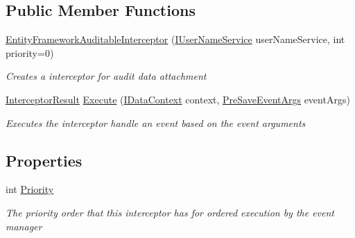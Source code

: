\subsection*{Public Member Functions}
\begin{DoxyCompactItemize}
\item 
\hyperlink{class_highway_1_1_data_1_1_entity_framework_1_1_interceptors_1_1_entity_framework_auditable_interceptor_af82e7af9db91d333a1faf197398405f3}{Entity\-Framework\-Auditable\-Interceptor} (\hyperlink{interface_highway_1_1_data_1_1_interfaces_1_1_i_user_name_service}{I\-User\-Name\-Service} user\-Name\-Service, int priority=0)
\begin{DoxyCompactList}\small\item\em Creates a interceptor for audit data attachment \end{DoxyCompactList}\item 
\hyperlink{struct_highway_1_1_data_1_1_interceptors_1_1_interceptor_result}{Interceptor\-Result} \hyperlink{class_highway_1_1_data_1_1_entity_framework_1_1_interceptors_1_1_entity_framework_auditable_interceptor_afb272779790d7da3d2006d94236b450e}{Execute} (\hyperlink{interface_highway_1_1_data_1_1_interfaces_1_1_i_data_context}{I\-Data\-Context} context, \hyperlink{class_highway_1_1_data_1_1_interceptors_1_1_events_1_1_pre_save_event_args}{Pre\-Save\-Event\-Args} event\-Args)
\begin{DoxyCompactList}\small\item\em Executes the interceptor handle an event based on the event arguments \end{DoxyCompactList}\end{DoxyCompactItemize}
\subsection*{Properties}
\begin{DoxyCompactItemize}
\item 
int \hyperlink{class_highway_1_1_data_1_1_entity_framework_1_1_interceptors_1_1_entity_framework_auditable_interceptor_a49eb8fc89f9eb1b4103f29d4f4c45d6b}{Priority}
\begin{DoxyCompactList}\small\item\em The priority order that this interceptor has for ordered execution by the event manager \end{DoxyCompactList}\end{DoxyCompactItemize}


